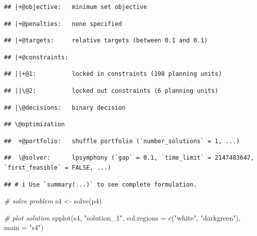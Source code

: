 \documentclass[
  12pt,
]{book}
\newenvironment{Shaded}{\begin{snugshade}}{\end{snugshade}}
\newcommand{\AttributeTok}[1]{\textcolor[rgb]{0.77,0.63,0.00}{#1}}
\newcommand{\CommentTok}[1]{\textcolor[rgb]{0.56,0.35,0.01}{\textit{#1}}}
\newcommand{\FunctionTok}[1]{\textcolor[rgb]{0.00,0.00,0.00}{#1}}
\newcommand{\NormalTok}[1]{#1}
\newcommand{\OtherTok}[1]{\textcolor[rgb]{0.56,0.35,0.01}{#1}}
\newcommand{\StringTok}[1]{\textcolor[rgb]{0.31,0.60,0.02}{#1}}
\begin{document}
\begin{verbatim}
## |+@objective:   minimum set objective
\end{verbatim}

\begin{verbatim}
## |+@penalties:   none specified
\end{verbatim}

\begin{verbatim}
## |+@targets:     relative targets (between 0.1 and 0.1)
\end{verbatim}

\begin{verbatim}
## |+@constraints:
\end{verbatim}

\begin{verbatim}
## ||+@1:          locked in constraints (198 planning units)
\end{verbatim}

\begin{verbatim}
## ||\@2:          locked out constraints (6 planning units)
\end{verbatim}

\begin{verbatim}
## |\@decisions:   binary decision
\end{verbatim}

\begin{verbatim}
## \@optimization
\end{verbatim}

\begin{verbatim}
##  +@portfolio:   shuffle portfolio (`number_solutions` = 1, ...)
\end{verbatim}

\begin{verbatim}
##  \@solver:      lpsymphony (`gap` = 0.1, `time_limit` = 2147483647, `first_feasible` = FALSE, ...)
\end{verbatim}

\begin{verbatim}
## # i Use `summary(...)` to see complete formulation.
\end{verbatim}

\begin{Shaded}
\begin{Highlighting}[]
\CommentTok{\# solve problem}
\NormalTok{s4 }\OtherTok{\textless{}{-}} \FunctionTok{solve}\NormalTok{(p4)}

\CommentTok{\# plot solution}
\FunctionTok{spplot}\NormalTok{(s4, }\StringTok{"solution\_1"}\NormalTok{, }\AttributeTok{col.regions =} \FunctionTok{c}\NormalTok{(}\StringTok{"white"}\NormalTok{, }\StringTok{"darkgreen"}\NormalTok{), }\AttributeTok{main =} \StringTok{"s4"}\NormalTok{)}
\end{Highlighting}
\end{Shaded}
\end{document}
